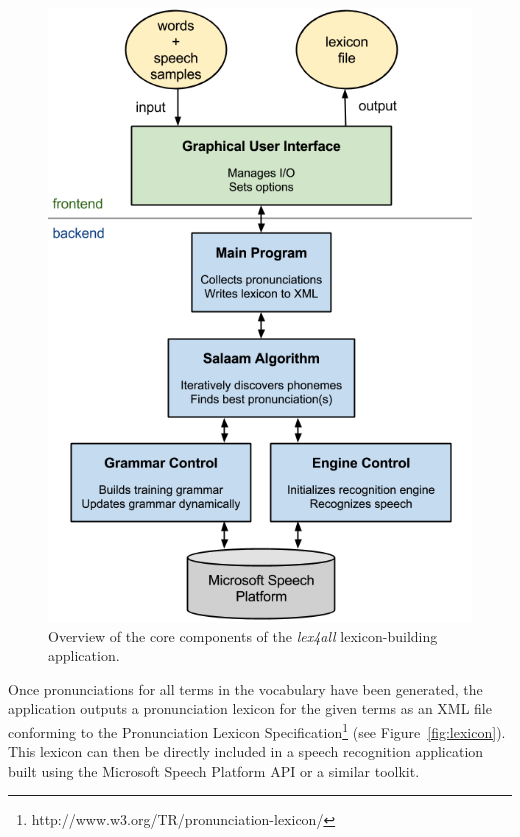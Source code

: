 \documentclass[11pt]{article}
\begin{document}
\begin{figure}[t]
\begin{center}
\includegraphics[width=\columnwidth]{../img/SystemOverview-compact.png}
\caption{Overview of the core components of the \textit{lex4all} lexicon-building application.\label{fig:system}}
\end{center}
\end{figure}

Once pronunciations for all terms in the vocabulary have been generated, the application outputs a pronunciation lexicon for the given terms as an XML file conforming to the Pronunciation Lexicon Specification\footnote{http://www.w3.org/TR/pronunciation-lexicon/} (see Figure~\ref{fig:lexicon}). This lexicon can then be directly included in a speech recognition application built using the Microsoft Speech Platform API or a similar toolkit.
\end{document}
